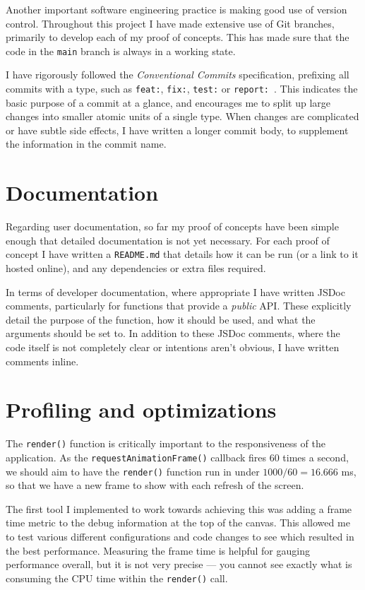 \documentclass{final_report}
\begin{document}
Another important software engineering practice is making good use of version control. Throughout this project I have made extensive use of Git branches, primarily to develop each of my proof of concepts. This has made sure that the code in the \texttt{main} branch is always in a working state.

I have rigorously followed the \emph{Conventional Commits} specification, prefixing all commits with a type, such as \texttt{feat:}, \texttt{fix:}, \texttt{test:} or \texttt{report:}~\cite{conventional-commits}. This indicates the basic purpose of a commit at a glance, and encourages me to split up large changes into smaller atomic units of a single type. When changes are complicated or have subtle side effects, I have written a longer commit body, to supplement the information in the commit name.

\section{Documentation}

Regarding user documentation, so far my proof of concepts have been simple enough that detailed documentation is not yet necessary. For each proof of concept I have written a \texttt{README.md} that details how it can be run (or a link to it hosted online), and any dependencies or extra files required.

In terms of developer documentation, where appropriate I have written JSDoc comments, particularly for functions that provide a \emph{public} API\@. These explicitly detail the purpose of the function, how it should be used, and what the arguments should be set to. In addition to these JSDoc comments, where the code itself is not completely clear or intentions aren't obvious, I have written comments inline.

\section{Profiling and optimizations}

The \texttt{render()} function is critically important to the responsiveness of the application. As the \texttt{requestAnimationFrame()} callback fires 60 times a second, we should aim to have the \texttt{render()} function run in under \(1000/60=16.666\) ms, so that we have a new frame to show with each refresh of the screen. 

The first tool I implemented to work towards achieving this was adding a frame time metric to the debug information at the top of the canvas. This allowed me to test various different configurations and code changes to see which resulted in the best performance. Measuring the frame time is helpful for gauging performance overall, but it is not very precise --- you cannot see exactly what is consuming the CPU time within the \texttt{render()} call.
\end{document}
